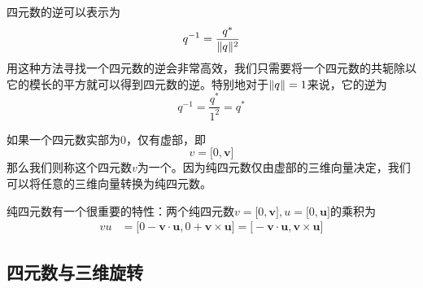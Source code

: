 {
	四元数的逆可以表示为
	\begin{equation}
		q^{-1} = \dfrac{q^*}{\norm[q]^2}
	\end{equation}
	用这种方法寻找一个四元数的逆会非常高效，我们只需要将一个四元数的共轭除以它的模长的平方就可以得到四元数的逆。特别地对于$\norm[q] = 1$来说，它的逆为
	\begin{equation}
		q^{-1} = \dfrac{q^*}{1^2} = q^*
	\end{equation}
}


\sssection[纯四元数]
\vspace*{-0.5em}

{
	如果一个四元数实部为0，仅有虚部，即
	\begin{equation}
		v = \big[ 0, \bm{v} \big]
	\end{equation}
	那么我们则称这个四元数$v$为一个。因为纯四元数仅由虚部的三维向量决定，我们可以将任意的三维向量转换为纯四元数。
}

纯四元数有一个很重要的特性：两个纯四元数$v = \big[ 0, \bm{v} \big], u = \big[ 0, \bm{u} \big]$的乘积为
\begin{align}
	vu &= \big[ 0 - \bm{v} \cdot \bm{u}, 0 + \bm{v} \times \bm{u} \big]  = \big[ - \bm{v} \cdot \bm{u}, \bm{v} \times \bm{u} \big]
	\label{eq: 纯四元数乘法}
\end{align}


\subsection{四元数与三维旋转}

